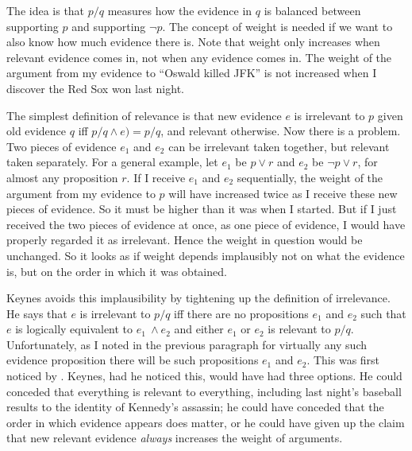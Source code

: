 \noindent The idea is that \(p / q\) measures how the evidence in \(q\) is balanced between supporting \(p\) and supporting \(\neg p\). The concept of weight is needed if we want to also know how much evidence there is. Note that weight only increases when relevant evidence comes in, not when any evidence comes in. The weight of the argument from my evidence to ``Oswald killed JFK'' is not increased when I discover the Red Sox won last night.

The simplest definition of relevance is that new evidence \(e\) is irrelevant to \(p\) given old evidence \(q\) iff \(p / q \wedge e)= p / q\), and relevant otherwise. Now there is a problem. Two pieces of evidence \(e_1\) and \(e_2\) can be irrelevant taken together, but relevant taken separately. For a general example, let \(e_1\) be \(p \vee r\) and \(e_2\) be \(\neg p \vee r\), for almost any proposition \(r\). If I receive \(e_1\) and \(e_2\) sequentially, the weight of the argument from my evidence to \(p\) will have increased twice as I receive these new pieces of evidence. So it must be higher than it was when I started. But if I just received the two pieces of evidence at once, as one piece of evidence, I would have properly regarded it as irrelevant. Hence the weight in question would be unchanged. So it looks as if weight depends implausibly not on what the evidence is, but on the order in which it was obtained.

Keynes avoids this implausibility by tightening up the definition of irrelevance. He says that \(e\) is irrelevant to \(p / q\) iff there are no propositions \(e_1\) and \(e_2\) such that \(e\) is logically equivalent to \(e_1\ \wedge e_2\) and either \(e_1\) or \(e_2\) is relevant to \(p / q\). Unfortunately, as I noted in the previous paragraph for virtually any such evidence proposition there will be such propositions \(e_1\) and \(e_2\). This was first noticed by \citet{Carnap1950}. Keynes, had he noticed this, would have had three options. He could conceded that everything is relevant to everything, including last night's baseball results to the identity of Kennedy's assassin; he could have conceded that the order in which evidence appears does matter, or he could have given up the claim that new relevant evidence \textit{always} increases the weight of arguments.

